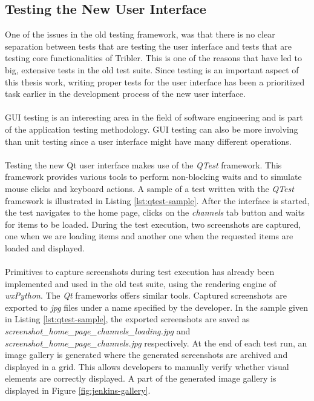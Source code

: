\subsection{Testing the New User Interface}
One of the issues in the old testing framework, was that there is no clear separation between tests that are testing the user interface and tests that are testing core functionalities of Tribler. This is one of the reasons that have led to big, extensive tests in the old test suite. Since testing is an important aspect of this thesis work, writing proper tests for the user interface has been a prioritized task earlier in the development process of the new user interface.\\\\
GUI testing is an interesting area in the field of software engineering and is part of the application testing methodology. GUI testing can also be more involving than unit testing since a user interface might have many different operations.\\\\
Testing the new Qt user interface makes use of the \emph{QTest} framework. This framework provides various tools to perform non-blocking waits and to  simulate mouse clicks and keyboard actions. A sample of a test written with the \emph{QTest} framework is illustrated in Listing \ref{lst:qtest-sample}. After the interface is started, the test navigates to the home page, clicks on the \emph{channels} tab button and waits for items to be loaded. During the test execution, two screenshots are captured, one when we are loading items and another one when the requested items are loaded and displayed.\\\\
Primitives to capture screenshots during test execution has already been implemented and used in the old test suite, using the rendering engine of \emph{wxPython}. The \emph{Qt} frameworks offers similar tools. Captured screenshots are exported to \emph{jpg} files under a name specified by the developer. In the sample given in Listing \ref{lst:qtest-sample}, the exported screenshots are saved as \emph{screenshot\_home\_page\_channels\_loading.jpg} and \emph{screenshot\_home\_page\_channels.jpg} respectively. At the end of each test run, an image gallery is generated where the generated screenshots are archived and displayed in a grid. This allows developers to manually verify whether visual elements are correctly displayed. A part of the generated image gallery is displayed in Figure \ref{fig:jenkins-gallery}.

